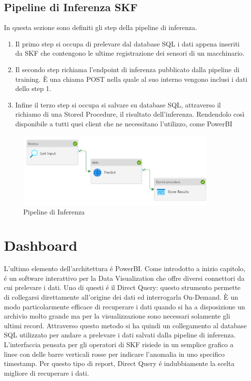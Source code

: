 \subsection{Pipeline di Inferenza SKF}
In questa sezione sono definiti gli step della pipeline di inferenza.
\begin{enumerate}
	\item Il primo step si occupa di prelevare dal database SQL i dati appena inseriti da SKF che contengono le ultime registrazione dei sensori di un macchinario. 
	\item Il secondo step richiama l'endpoint di inferenza pubblicato dalla pipeline di training. È una chiama POST nella quale al suo interno vengono inclusi i dati dello step 1.
	\item Infine il terzo step si occupa si salvare su database SQL, attraverso il richiamo di una Stored Procedure, il risultato dell'inferenza. Rendendolo così disponibile a tutti quei client che ne necessitano l'utilizzo, come PowerBI
\end{enumerate}

\begin{figure}[t]
	\centering
	\includegraphics[width=10cm, scale=1]{images/pipeline-inference}
	\caption{Pipeline di Inferenza}
	\label{pipeline-inferenza}
\end{figure}

\section{Dashboard}
L'ultimo elemento dell'architettura é PowerBI. Come introdotto a inizio capitolo, é un software interattivo per la Data Visualization che offre diversi connettori da cui prelevare i dati. Uno di questi é il Direct Query: questo strumento permette di collegarsi direttamente all'origine dei dati ed interrogarla On-Demand. È un modo particolarmente efficace di recuperare i dati quando si ha a disposizione un archivio molto grande ma per la visualizzazione sono necessari solamente gli ultimi record. 
Attraverso questo metodo si ha quindi un collegamento al database SQL utilizzato per andare a prelevare i dati salvati dalla pipeline di inferenza.
L'interfaccia pensata per gli operatori di SKF risiede in un semplice grafico a linee con delle barre verticali rosse per indicare l'anomalia in uno specifico timestamp. Per questo tipo di report, Direct Query é indubbiamente la scelta migliore di recuperare i dati.  


